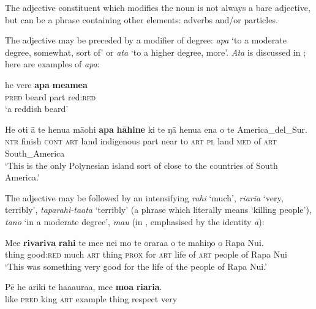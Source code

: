 The adjective constituent which modifies the noun is not always a bare adjective, but can be a phrase containing other elements: adverbs and/or particles.

The adjective may be preceded by a modifier of degree: \textit{{\ꞌ}apa} ‘to a moderate degree, somewhat, sort of’ or \textit{{\ꞌ}ata} ‘to a higher degree, more’. \textit{{\ꞌ}Ata} is discussed in ; here are examples of \textit{{\ꞌ}apa}:

\ea\label{ex:5.138}
\gll he vere \textbf{{\ꞌ}apa} \textbf{meamea} \\
\textsc{pred} beard part red:\textsc{red} \\

\glt 
‘a reddish beard’  
\z

\ea\label{ex:5.139}
\gll He oti {\ꞌ}ā te henua mā{\ꞌ}ohi \textbf{{\ꞌ}apa} \textbf{hāhine} ki te ŋā henua ena  o te America\_del\_Sur.\\
\textsc{ntr} finish \textsc{cont} \textsc{art} land indigenous part near to \textsc{art} \textsc{pl} land \textsc{med}  of \textsc{art} South\_America\\

\glt 
‘This is the only Polynesian island sort of close to the countries of South America.’ \textstyleExampleref{[R350.003]} 
\z

The adjective may be followed by an intensifying  \textit{rahi} ‘much’, \textit{\mbox{ri{\ꞌ}ari{\ꞌ}a}} ‘very, terribly’, \textit{taparahi-ta{\ꞌ}ata} ‘terribly’ (a  phrase which literally means ‘killing people’), \textit{tano} ‘in a moderate degree’, \textit{mau} (in , emphasised by the identity  \textit{{\ꞌ}ā}):

\ea\label{ex:5.140}
\gll Me{\ꞌ}e \textbf{rivariva} \textbf{rahi} te me{\ꞌ}e nei mo te orara{\ꞌ}a o te mahiŋo o Rapa Nui. \\
thing good:\textsc{red} much \textsc{art} thing \textsc{prox} for \textsc{art} life of \textsc{art} people of Rapa Nui \\

\glt 
‘This was something very good for the life of the people of Rapa Nui.’ \textstyleExampleref{[R231.314]} 
\z

\ea\label{ex:5.141}
\gll Pē he {\ꞌ}ariki te ha{\ꞌ}aaura{\ꞌ}a, me{\ꞌ}e \textbf{mo{\ꞌ}a} \textbf{ri{\ꞌ}ari{\ꞌ}a}. \\
like \textsc{pred} king \textsc{art} example thing respect very \\

